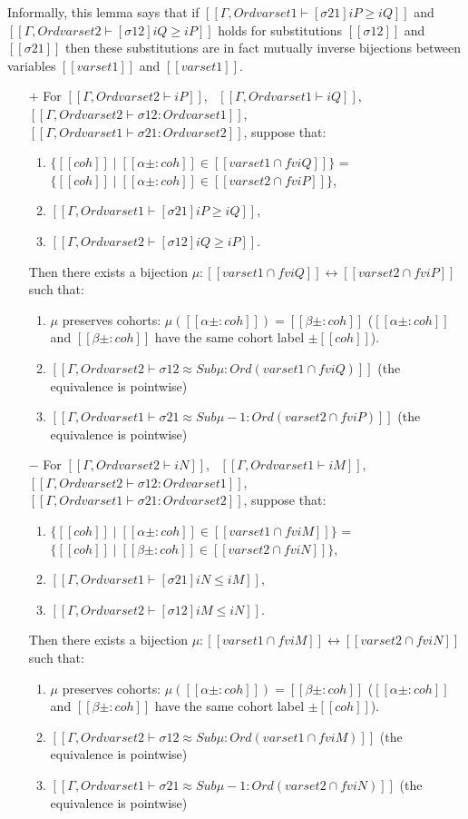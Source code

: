 \begin{lemma}
  Informally, this lemma says that if $[[Γ, Ord varset1 ⊢ [σ21]iP ≥ iQ]]$
  and $[[Γ, Ord varset2 ⊢ [σ12]iQ ≥ iP]]$ holds for substitutions $[[σ12]]$
  and $[[σ21]]$ then these substitutions are in fact mutually inverse bijections
  between variables $[[varset1]]$ and $[[varset1]]$.

  \begin{itemize}
  \item[$+$]
    For $[[Γ, Ord varset2 ⊢ iP]]$,~ $[[Γ, Ord varset1 ⊢ iQ]]$,~
    $[[Γ, Ord varset2 ⊢ σ12 : Ord varset1]]$,~
    $[[Γ, Ord varset1 ⊢ σ21 : Ord varset2]]$,
    suppose that:
    \begin{enumerate}
      \item $\{ [[coh]] \mid [[α±:coh]] \in [[varset1 ∩ fv iQ]] \}$ = $\{ [[coh]] \mid [[α±:coh]] \in [[varset2 ∩ fv iP]] \}$,
      \item $[[Γ, Ord varset1 ⊢ [σ21]iP ≥ iQ]]$,
      \item $[[Γ, Ord varset2 ⊢ [σ12]iQ ≥ iP]]$.
    \end{enumerate}
    Then there exists a bijection
    $\mu : [[varset1 ∩ fv iQ]] \leftrightarrow [[varset2 ∩ fv iP]]$ such that:
    \begin{enumerate}
    \item $\mu$ preserves cohorts:
      $\mu ([[α±:coh]]) = [[β±:coh]]$ ($[[α±:coh]]$ and $[[β±:coh]]$
      have the same cohort label $\pm [[coh]]$).
    \item $[[Γ, Ord varset2 ⊢ σ12 ≈ Sub μ   : Ord (varset1 ∩ fv iQ) ]]$ (the equivalence is pointwise)
    \item $[[Γ, Ord varset1 ⊢ σ21 ≈ Sub μ-1 : Ord (varset2 ∩ fv iP) ]]$ (the equivalence is pointwise)
    \end{enumerate}

  \item[$-$]
    For $[[Γ, Ord varset2 ⊢ iN]]$,~ $[[Γ, Ord varset1 ⊢ iM]]$,~
    $[[Γ, Ord varset2 ⊢ σ12 : Ord varset1]]$,~
    $[[Γ, Ord varset1 ⊢ σ21 : Ord varset2]]$,
    suppose that:
    \begin{enumerate}
    \item $\{ [[coh]] \mid [[α±:coh]] \in [[varset1 ∩ fv iM]] \}$ = $\{ [[coh]] \mid [[β±:coh]] \in [[varset2 ∩ fv iN]] \}$,
    \item $[[Γ, Ord varset1 ⊢ [σ21]iN ≤ iM]]$,
    \item $[[Γ, Ord varset2 ⊢ [σ12]iM ≤ iN]]$.
    \end{enumerate}
    Then there exists a bijection
    $\mu : [[varset1 ∩ fv iM]] \leftrightarrow [[varset2 ∩ fv iN]]$ such that:
    \begin{enumerate}
    \item $\mu$ preserves cohorts:
      $\mu ([[α±:coh]]) = [[β±:coh]]$ ($[[α±:coh]]$ and $[[β±:coh]]$
      have the same cohort label $\pm [[coh]]$).
    \item $[[Γ, Ord varset2 ⊢ σ12 ≈ Sub μ : Ord (varset1 ∩ fv iM) ]]$ (the equivalence is pointwise)
    \item $[[Γ, Ord varset1 ⊢ σ21 ≈ Sub μ-1 : Ord (varset2 ∩ fv iN)]]$ (the equivalence is pointwise)
    \end{enumerate}
  \end{itemize}
\end{lemma}
